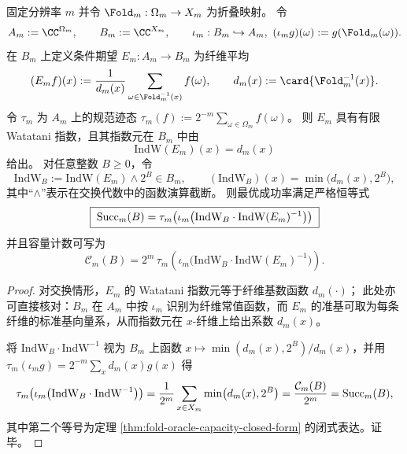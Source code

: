 \begin{proposition}\label{prop:fold-oracle-watatani-index-trace-formula}
固定分辨率 \(m\) 并令
\(
\Fold_m:\Omega_m\to X_m
\)
为折叠映射。
令
\[
A_m:=\CC^{\Omega_m},\qquad B_m:=\CC^{X_m},
\qquad
\iota_m:B_m\hookrightarrow A_m,\ (\iota_m g)(\omega):=g(\Fold_m(\omega)).
\]
在 \(B_m\) 上定义条件期望 \(E_m:A_m\to B_m\) 为纤维平均
\[
(E_m f)(x):=\frac{1}{d_m(x)}\sum_{\omega\in\Fold_m^{-1}(x)}f(\omega),
\qquad d_m(x):=\card{\Fold_m^{-1}(x)}.
\]
令 \(\tau_m\) 为 \(A_m\) 上的规范迹态
\(
\tau_m(f):=2^{-m}\sum_{\omega\in\Omega_m}f(\omega)
\)。
则 \(E_m\) 具有有限 Watatani 指数，且其指数元在 \(B_m\) 中由
\[
\mathrm{IndW}(E_m)(x)=d_m(x)
\]
给出。
对任意整数 \(B\ge 0\)，令
\[
\mathrm{IndW}_B:=\mathrm{IndW}(E_m)\wedge 2^B\in B_m,\qquad
(\mathrm{IndW}_B)(x)=\min\bigl(d_m(x),2^B\bigr),
\]
其中“\(\wedge\)”表示在交换代数中的函数演算截断。
则最优成功率满足严格恒等式
\[
\boxed{\;
{\rm Succ}_m(B)
=\tau_m\!\left(\iota_m\bigl(\mathrm{IndW}_B\cdot \mathrm{IndW}(E_m)^{-1}\bigr)\right)\;}
\]
并且容量计数可写为
\[
\mathcal{C}_m(B)
=2^m\,\tau_m\!\left(\iota_m\bigl(\mathrm{IndW}_B\cdot \mathrm{IndW}(E_m)^{-1}\bigr)\right).
\]
\end{proposition}
\begin{proof}
对交换情形，\(E_m\) 的 Watatani 指数元等于纤维基数函数 \(d_m(\cdot)\)；
此处亦可直接核对：\(B_m\) 在 \(A_m\) 中按 \(\iota_m\) 识别为纤维常值函数，而 \(E_m\) 的准基可取为每条纤维的标准基向量系，从而指数元在 \(x\)-纤维上给出系数 \(d_m(x)\)。
\par
将 \(\mathrm{IndW}_B\cdot \mathrm{IndW}^{-1}\) 视为 \(B_m\) 上函数 \(x\mapsto \min(d_m(x),2^B)/d_m(x)\)，并用 \(\tau_m(\iota_m g)=2^{-m}\sum_x d_m(x)g(x)\) 得
\[
\tau_m\!\left(\iota_m\bigl(\mathrm{IndW}_B\cdot \mathrm{IndW}^{-1}\bigr)\right)
=\frac{1}{2^m}\sum_{x\in X_m}\min\bigl(d_m(x),2^B\bigr)
=\frac{\mathcal{C}_m(B)}{2^m}
={\rm Succ}_m(B),
\]
其中第二个等号为定理 \ref{thm:fold-oracle-capacity-closed-form} 的闭式表达。证毕。
\end{proof}

